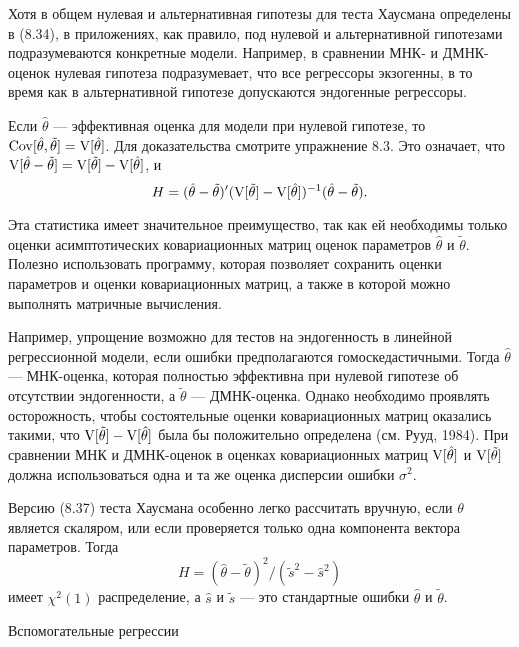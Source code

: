 Хотя в общем нулевая и альтернативная гипотезы для теста Хаусмана определены в (8.34), в приложениях, как правило, под нулевой и альтернативной гипотезами подразумеваются конкретные модели. Например, в сравнении МНК- и ДМНК-оценок нулевая гипотеза подразумевает, что все  регрессоры экзогенны, в то время как в альтернативной гипотезе допускаются эндогенные регрессоры.

Если $\hat{\theta}$ --- эффективная оценка для модели при нулевой гипотезе, то $\mathrm{Cov}[\hat{\theta},\tilde{\theta}] = \mathrm{V}[\hat{\theta}]$. Для доказательства смотрите упражнение 8.3. Это означает, что $\mathrm{V}[\hat{\theta} - \tilde{\theta}] = \mathrm{V}[\tilde{\theta}] - \mathrm{V}[\hat{\theta}]$, и
\begin{equation}
H = (\hat{\theta} - \tilde{\theta})'(\mathrm{V}[\tilde{\theta}] - \mathrm{V}[\hat{\theta}])^{-1}(\hat{\theta} - \tilde{\theta}).
\end{equation}

Эта статистика имеет значительное преимущество, так как ей необходимы только оценки асимптотических ковариационных матриц оценок параметров $\hat{\theta}$ и $\tilde{\theta}$. Полезно использовать программу, которая позволяет сохранить оценки параметров и оценки ковариационных матриц, а также в которой можно выполнять матричные вычисления.

Например, упрощение возможно для тестов на эндогенность в линейной регрессионной модели, если ошибки предполагаются гомоскедастичными. Тогда $\hat{\theta}$ --- МНК-оценка, которая полностью эффективна при нулевой гипотезе об отсутствии эндогенности, а $\tilde{\theta}$ --- ДМНК-оценка. Однако необходимо проявлять осторожность, чтобы состоятельные оценки ковариационных матриц оказались такими, что $\mathrm{V}[\tilde{\theta}] - \mathrm{V}[\hat{\theta}]$ была бы положительно определена (см. Рууд, 1984). При сравнении МНК и ДМНК-оценок в оценках ковариационных матриц $\mathrm{V}[\hat{\theta}]$ и $\mathrm{V}[\tilde{\theta}]$ должна использоваться одна и та же оценка дисперсии ошибки $\sigma^2$.

Версию (8.37) теста Хаусмана особенно легко рассчитать вручную, если $\theta$ является скаляром, или если проверяется только одна компонента вектора параметров. Тогда
\[
H = (\hat{\theta} - \tilde{\theta})^2/(\tilde{s}^2 - \hat{s}^2)
\]
имеет $\chi^2(1)$ распределение, а $\hat{s}$ и $\tilde{s}$ --- это стандартные ошибки $\hat{\theta}$ и $\tilde{\theta}$.

\begin{center}
Вспомогательные регрессии
\end{center}

